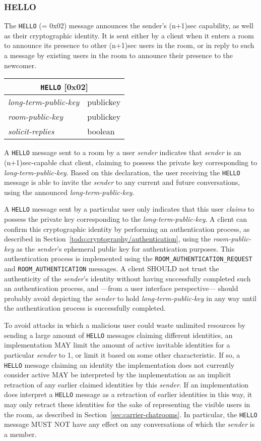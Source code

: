 \documentclass{article}
\def\message#1{\texttt{#1}}
\def\field#1{\textit{#1}}
\newenvironment{basicmessage}[2]{
\newcommand{\messagefield}[2]{
\field{##1} & \textsf{##2} \\
\hline
}
\begin{tabular}{|l|l|}
\hline
\multicolumn{2}{|c|}{\message{#1} [#2]} \\
\hline
\hline
}{
\end{tabular}
}
\begin{document}
\subsubsection{HELLO}
\label{sec:messages/hello}

The \message{HELLO} (= 0x02) message announces the sender's (n+1)sec capability, as well as their cryptographic identity.
It is sent either by a client when it enters a room to announce its presence to other (n+1)sec users in the room, or in reply to such a message by existing users in the room to announce their presence to the newcomer.

\begin{basicmessage}{HELLO}{0x02}
\messagefield{long-term-public-key}{publickey}
\messagefield{room-public-key}{publickey}
\messagefield{solicit-replies}{boolean}
\end{basicmessage}

A \message{HELLO} message sent to a room by a user \field{sender} indicates that \field{sender} is an (n+1)sec-capable chat client, claiming to possess the private key corresponding to \field{long-term-public-key}.
Based on this declaration, the user receiving the \message{HELLO} message is able to invite the \field{sender} to any current and future conversations, using the announced \field{long-term-public-key}.

A \message{HELLO} message sent by a particular user only indicates that this user \emph{claims} to possess the private key corresponding to the \field{long-term-public-key}.
A client can confirm this cryptographic identity by performing an authentication process, as described in Section~\ref{todo:cryptography/authentication}, using the \field{room-public-key} as the \field{sender}'s ephemeral public key for authentication purposes.
This authentication process is implemented using the \message{ROOM\_AUTHENTICATION\_REQUEST} and \message{ROOM\_AUTHENTICATION} messages.
A client SHOULD not trust the authenticity of the \field{sender}'s identity without having successfully completed such an authentication process, and ---from a user interface perspective--- should probably avoid depicting the \field{sender} to hold \field{long-term-public-key} in any way until the authentication process is successfully completed.

To avoid attacks in which a malicious user could waste unlimited resources by sending a large amount of \message{HELLO} messages claiming different identities, an implementation MAY limit the amount of active invitable identities for a particular \field{sender} to 1, or limit it based on some other characteristic.
If so, a \message{HELLO} message claiming an identity the implementation does not currently consider active MAY be interpreted by the implementation as an implicit retraction of any earlier claimed identities by this \field{sender}.
If an implementation does interpret a \message{HELLO} message as a retraction of earlier identities in this way, it may only retract these identities for the sake of representing the visible users in the room, as described in Section~\ref{sec:carrier-chatrooms}.
In particular, the \message{HELLO} message MUST NOT have any effect on any conversations of which the \field{sender} is a member.
\end{document}
